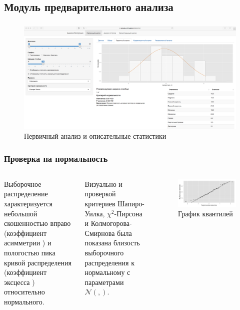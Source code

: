 \documentclass[10pt,pdf,aspectratio=169,hyperref={unicode},notheorems]{beamer}
\theoremstyle{definition}
\theoremstyle{example}
\theoremstyle{plain}
\newcommand{\inp}[1]{}
\newcommand{\descriptive}[2]{\inp{#1/descriptive/#2}}
\newcommand{\normaldistr}{$\mathcal{N}(\descriptive{original}{mean}, \descriptive{original}{variance})$}
\begin{document}
\subsection{Модуль предварительного анализа}

\begin{frame}
  \frametitle{\large\secname}
  \framesubtitle{\subsecname}
    \begin{figure}[h]
    \includegraphics[width=1\textwidth]{../../figures/static/1_basis.png}
    \caption{Первичный анализ и описательные статистики}
  \end{figure}
\end{frame}

\begin{frame}
  \frametitle{Проверка на нормальность}
  \begin{columns}[c]
  \column{2in}
  Выборочное распределение характеризуется небольшой скошенностью вправо (коэффициент асимметрии $ \descriptive{original}{skew} $) и пологостью пика кривой распределения (коэффициент эксцесса $ \descriptive{original}{kurtosis} $) относительно нормального.

  \vspace{0.5em}

  Визуально и проверкой критериев Шапиро-Уилка, $\chi^2$-Пирсона и Колмогорова-Смирнова была показана близость выборочного распределения к нормальному с параметрами \normaldistr.
  \column{4in}
  \begin{figure}[h]
    \includegraphics[width=1\linewidth]{../../figures/original/quantile.png}
    \caption{График квантилей}
  \end{figure}
  \end{columns}
\end{frame}
\end{document}
